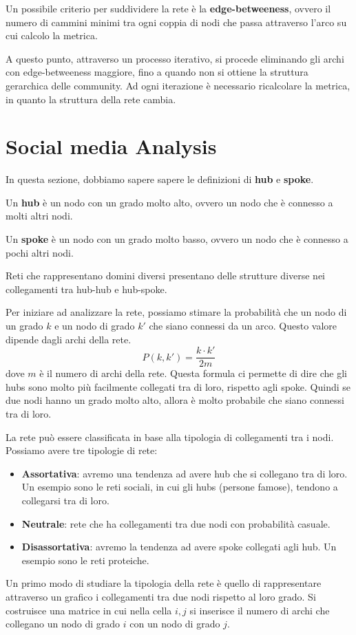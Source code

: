Un possibile criterio per suddividere la rete è la \textbf{edge-betweeness}, ovvero
il numero di cammini minimi tra ogni coppia di nodi che passa attraverso l'arco
su cui calcolo la metrica.

A questo punto, attraverso un processo iterativo, si procede eliminando gli archi
con edge-betweeness maggiore, fino a quando non si ottiene la struttura gerarchica
delle community. Ad ogni iterazione è necessario ricalcolare la metrica, in quanto
la struttura della rete cambia.
\section{Social media Analysis}
In questa sezione, dobbiamo sapere sapere le definizioni di \textbf{hub} e \textbf{spoke}.
\begin{definizione}
    Un \textbf{hub} è un nodo con un grado molto alto, ovvero un nodo che è 
    connesso a molti altri nodi.
\end{definizione}
\begin{definizione}
    Un \textbf{spoke} è un nodo con un grado molto basso, ovvero un nodo che è 
    connesso a pochi altri nodi.
\end{definizione}
Reti che rappresentano domini diversi presentano delle strutture diverse nei
collegamenti tra hub-hub e hub-spoke.

Per iniziare ad analizzare la rete, possiamo stimare la probabilità che un nodo
di un grado $k$ e un nodo di grado $k'$ che siano connessi da un arco. Questo
valore dipende dagli archi della rete.
\begin{equation}
    P(k, k') = \frac{k \cdot k'}{2m}
\end{equation}
dove $m$ è il numero di archi della rete. Questa formula ci permette di dire che
gli hubs sono molto più facilmente collegati tra di loro, rispetto agli spoke.
Quindi se due nodi hanno un grado molto alto, allora è molto probabile che siano
connessi tra di loro.

La rete può essere classificata in base alla tipologia di collegamenti tra i nodi.
Possiamo avere tre tipologie di rete:
\begin{itemize}
    \item \textbf{Assortativa}: avremo una tendenza ad avere hub che si collegano
          tra di loro. Un esempio sono le reti sociali, in cui gli hubs (persone
          famose), tendono a collegarsi tra di loro.
    \item \textbf{Neutrale}: rete che ha collegamenti tra due nodi con probabilità
          casuale.
    \item \textbf{Disassortativa}: avremo la tendenza ad avere spoke collegati
          agli hub. Un esempio sono le reti proteiche.
\end{itemize}
Un primo modo di studiare la tipologia della rete è quello di rappresentare
attraverso un grafico i collegamenti tra due nodi rispetto al loro grado. Si
costruisce una matrice in cui nella cella $i, j$ si inserisce il numero di archi
che collegano un nodo di grado $i$ con un nodo di grado $j$.


